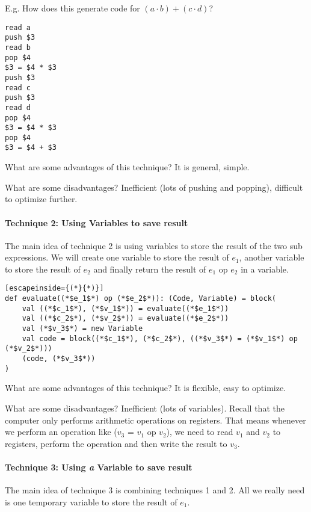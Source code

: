 \documentclass[12pt, letterpaper]{article}
\begin{document}
E.g. How does this generate code for \((a \cdot b) + (c \cdot d)\)?

\begin{verbatim}
read a
push $3
read b
pop $4
$3 = $4 * $3
push $3
read c
push $3
read d
pop $4
$3 = $4 * $3
pop $4
$3 = $4 + $3
\end{verbatim}

What are some advantages of this technique? It is general, simple.

What are some disadvantages? Inefficient (lots of pushing and popping), difficult to optimize further.

\paragraph{Technique 2: Using Variables to save result} \hfill

The main idea of technique 2 is using variables to store the result of the two sub expressions. We will create one variable to store the result of \(e_1\), another variable to store the result of \(e_2\) and finally return the result of  \(e_1\) op \(e_2\) in a variable.\\

\begin{lstlisting}[escapeinside={(*}{*)}]
def evaluate((*$e_1$*) op (*$e_2$*)): (Code, Variable) = block(
	val ((*$c_1$*), (*$v_1$*)) = evaluate((*$e_1$*))
	val ((*$c_2$*), (*$v_2$*)) = evaluate((*$e_2$*))
	val (*$v_3$*) = new Variable
	val code = block((*$c_1$*), (*$c_2$*), ((*$v_3$*) = (*$v_1$*) op (*$v_2$*)))
	(code, (*$v_3$*))
)
\end{lstlisting}

What are some advantages of this technique? It is flexible, easy to optimize.

What are some disadvantages? Inefficient (lots of variables). Recall that the computer only performs arithmetic operations on registers. That means whenever we perform an operation like (\(v_3\) = \(v_1\) op \(v_2\)), we need to read \(v_1\) and \(v_2\) to registers, perform the operation and then write the result to \(v_3\).

\paragraph{Technique 3: Using \emph{a} Variable to save result} \hfill

The main idea of technique 3 is combining techniques 1 and 2. All we really need is one temporary variable to store the result of \(e_1\).\\
\end{document}
